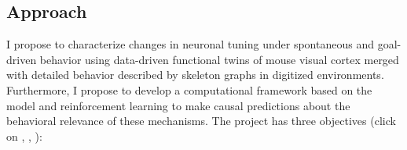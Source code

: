 \documentclass[COG,11pt]{ercgrant}
\begin{document}
\subsection{Approach}
I propose to characterize changes in neuronal tuning under spontaneous and goal-driven behavior using data-driven functional twins of mouse visual cortex merged with detailed behavior described by skeleton graphs in digitized environments.
Furthermore, I propose to develop a computational framework based on the model and reinforcement learning to make causal predictions about the behavioral relevance of these mechanisms. The project has three objectives (click on , , ):
\end{document}
